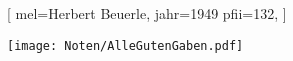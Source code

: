 [
    mel={Herbert Beuerle},
	jahr={1949}
	pfii={132},
]

\texttt{[image: Noten/AlleGutenGaben.pdf]}

\endsong

\beginscripture{}~\\
\endscripture